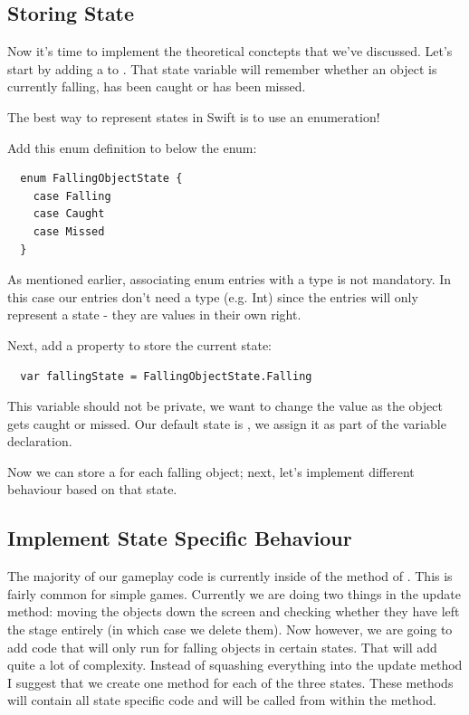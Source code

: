 \subsection{Storing State}
Now it's time to implement the theoretical conctepts that we've discussed. 
Let's start by adding a  to
. That state variable will remember whether an object is currently falling, has been caught
or has been missed.

The best way to represent states in Swift is to use an enumeration!
\begin{leftbar}
Add this enum definition to  below the
 enum:
\begin{lstlisting}
  enum FallingObjectState {
    case Falling
    case Caught
    case Missed
  }
\end{lstlisting}
\end{leftbar}
As mentioned earlier, associating enum entries with a type is not
mandatory. In this case our entries don't need a type (e.g. Int) since the
entries will only represent a state - they are values in their own right.

\begin{leftbar}
Next, add a property to store the current state:
\begin{lstlisting}
  var fallingState = FallingObjectState.Falling
\end{lstlisting}
\end{leftbar}
This variable should not be private, we want to change the value as
the object gets caught or missed. Our default state is , we
assign it as part of the variable declaration.

Now we can store a  for each falling object; next,
let's implement different behaviour based on that state.

\subsection{Implement State Specific Behaviour}
The majority of our gameplay code is currently inside of the 
method of . This is fairly common for simple games.
Currently we are doing two things in the update method: moving the objects down
the screen and checking whether they have left the stage entirely (in which
case we delete them). Now however, we are going to add code that will only run
for falling objects in certain states. That will add quite a lot of complexity.
Instead of squashing everything into the update method I suggest that we
create one method for each of the three states. These methods will contain
all state specific code and will be called from within the 
method.

